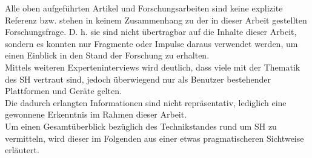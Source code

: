     Alle oben aufgeführten Artikel und Forschungsarbeiten sind keine explizite Referenz bzw. stehen in keinem  
    Zusammenhang zu der in dieser Arbeit gestellten Forschungsfrage. D. h. sie sind nicht übertragbar auf die Inhalte dieser Arbeit, sondern 
    es konnten nur Fragmente oder Impulse daraus verwendet werden, um einen Einblick in den Stand der Forschung zu erhalten. 
    \\ 
    Mittels weiteren Experteninterviews wird deutlich, dass viele mit der 
    Thematik des \acl{SH} vertraut sind, jedoch überwiegend nur als Benutzer bestehender Plattformen und Geräte gelten.
    \\
    Die dadurch erlangten Informationen sind nicht repräsentativ, lediglich eine gewonnene Erkenntnis im Rahmen 
    dieser Arbeit.
    \\
    Um einen Gesamtüberblick bezüglich des Technikstandes rund um \acl{SH} zu vermitteln, 
    wird dieser im Folgenden aus einer etwas pragmatischeren Sichtweise erläutert.
    
